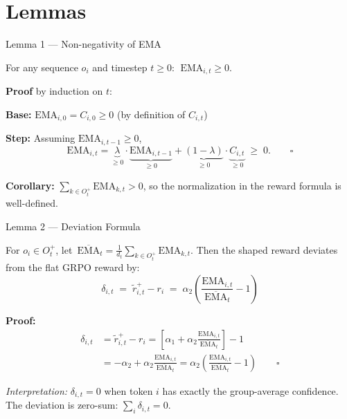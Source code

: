 \documentclass[aspectratio=169, 11pt]{beamer}
\newcommand{\EMA}{\mathrm{EMA}}
\newcommand{\GEMA}{\overline{\mathrm{EMA}}}
\begin{document}
\section{Lemmas}

\begin{frame}{Lemma 1 — Non-negativity of EMA}

\begin{lemma}
For any sequence $o_i$ and timestep $t \geq 0$: $\;\EMA_{i,t} \geq 0$.
\end{lemma}

\textbf{Proof} by induction on $t$:

\smallskip
\textbf{Base:} $\EMA_{i,0} = C_{i,0} \geq 0$ \hfill(by definition of $C_{i,t}$)

\smallskip
\textbf{Step:} Assuming $\EMA_{i,t-1} \geq 0$,
\[
\EMA_{i,t} = \underbrace{\lambda}_{\geq 0} \cdot \underbrace{\EMA_{i,t-1}}_{\geq 0}
           + \underbrace{(1-\lambda)}_{\geq 0} \cdot \underbrace{C_{i,t}}_{\geq 0} \;\geq\; 0. \qquad\square
\]

\medskip
\textbf{Corollary:} $\displaystyle\sum_{k \in O^+_t} \EMA_{k,t} > 0$, so the normalization in
the reward formula is well-defined.

\end{frame}

\begin{frame}{Lemma 2 — Deviation Formula}

\begin{lemma}
For $o_i \in O^+_t$, let $\,\GEMA_t = \tfrac{1}{d_t}\sum_{k \in O^+_t} \EMA_{k,t}$.
Then the shaped reward deviates from the flat GRPO reward by:
\[
\delta_{i,t} \;=\; \tilde{r}^+_{i,t} - r_i \;=\; \alpha_2\!\left(\frac{\EMA_{i,t}}{\GEMA_t} - 1\right)
\]
\end{lemma}

\textbf{Proof:}
\begin{align*}
\delta_{i,t} &= \tilde{r}^+_{i,t} - r_i
= \left[\alpha_1 + \alpha_2 \frac{\EMA_{i,t}}{\GEMA_t}\right] - 1 \\
&= -\alpha_2 + \alpha_2 \frac{\EMA_{i,t}}{\GEMA_t}
= \alpha_2\!\left(\frac{\EMA_{i,t}}{\GEMA_t} - 1\right) \qquad\square
\end{align*}

\smallskip
\textit{Interpretation:} $\delta_{i,t} = 0$ when token $i$ has exactly the group-average
confidence. The deviation is zero-sum: $\sum_i \delta_{i,t} = 0$.

\end{frame}
\end{document}

